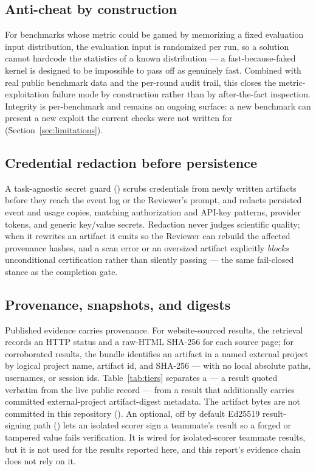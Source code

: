 \subsection{Anti-cheat by construction}

For benchmarks whose metric could be gamed by memorizing a fixed evaluation input
distribution, the evaluation input is randomized per run, so a solution cannot
hardcode the statistics of a known distribution --- a fast-because-faked kernel is
designed to be impossible to pass off as genuinely fast. Combined with real public
benchmark data and the per-round audit trail, this closes the metric-exploitation
failure mode by construction rather than by after-the-fact inspection. Integrity is
per-benchmark and remains an ongoing surface: a new benchmark can present a new
exploit the current checks were not written for (Section~\ref{sec:limitations}).

\subsection{Credential redaction before persistence}

A task-agnostic secret guard () scrubs credentials
from newly written artifacts before they reach the event log or the Reviewer's
prompt, and redacts persisted event and usage copies, matching authorization and
API-key patterns, provider tokens, and generic key/value secrets. Redaction never
judges scientific quality; when it rewrites an artifact it emits
 so the Reviewer can rebuild the affected provenance
hashes, and a scan error or an oversized artifact explicitly \emph{blocks}
unconditional certification rather than silently passing --- the same fail-closed
stance as the completion gate.

\subsection{Provenance, snapshots, and digests}

Published evidence carries provenance. For website-sourced results, the retrieval
records an HTTP status and a raw-HTML SHA-256 for each source page; for corroborated
results, the bundle identifies an artifact in a named external project by logical
project name, artifact id, and SHA-256 --- with no local absolute paths, usernames,
or session ids. Table~\ref{tab:tiers} separates a  --- a
result quoted verbatim from the live public record --- from a result that
additionally carries committed external-project artifact-digest metadata. The
artifact bytes are not committed in this repository
(). An optional, off by default
Ed25519 result-signing path () lets an
isolated scorer sign a teammate's result so a forged or tampered value fails
verification. It is wired for isolated-scorer teammate results, but it is
not used for the results reported here, and this report's evidence chain
does not rely on it.

